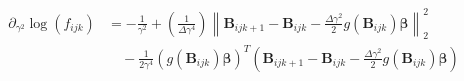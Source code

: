 \begin{align*}
\partial_{\gamma^2} \log(f_{ijk}) 
&= -\frac{1}{\gamma^2} 
+ \left( \frac{1}{\Delta \gamma^4} \right)
\left\lVert 
\textbf{B}_{ijk+1} - \textbf{B}_{ijk} 
- \frac{\Delta \gamma^2}{2} g(\textbf{B}_{ijk}) \bm{\beta}
\right\rVert_2^2 \\
&\quad - \frac{1}{2\gamma^4} 
\left( g(\textbf{B}_{ijk}) \bm{\beta} \right)^T 
\left( \textbf{B}_{ijk+1} - \textbf{B}_{ijk} 
- \frac{\Delta \gamma^2}{2} g(\textbf{B}_{ijk}) \bm{\beta} \right)
\end{align*}



\begin{comment}
    
We are given a grid of values $\{f_{ij}\}_{i,j}$ that represent the value of a covariate at points $(x_i, y_j)$. If we take a point $(x,y)$ in the study area, and say that $y_1$ is the value directly below $y$, $y_2$ is the value directly above $y$, $x_1$ is the value directly below $x$ and $x_2$ is the value directly above $x$ on the grid, then we can use linear interpolation to estimate the covariate at $(x,y)$ as 

$$
\hat{f}(x,y) = \frac{y_2-y}{y_2-y_1}(\frac{x_2-x}{x_2-x_1}f_{11} + \frac{x-x_1}{x_2-x_1}f_{21}) + \frac{y - y_1}{y_2-y_1}(\frac{x_2-x}{x_2-x_1}f_{12} + \frac{x-x_1}{x_2-x_1}f_{22})
$$

where $f_{11}$ is the value of the covariate $f$ at $(x_1, y_1)$, $f_{12}$ the value of $f$ at $(x_1, y_2)$, $f_{21}$ the value of $f$ at $(x_2, y_1)$, and $f_{22}$ the value of $f$ at $(x_2, y_2)$.

If we discretize the study area using $A_{ij} = \{(x,y) \in \mathbb{R}|x_i < x < x_{i+1}, y_j < y < y_{j+1}  \}$, then we can find the intensity of each area as


$$
\lambda_{ij} = \int_{x_i}^{x_{i+1}} \int_{y_i}^{y_{i+1}} \hat{f}(x,y) dydx
$$
$$
=\int_{x_i}^{x_{i+1}} [\frac{y_2y-y^2/2}{y_2-y_1}(\frac{x_2-x}{x_2-x_1}f_{11} + \frac{x-x_1}{x_2-x_1}f_{21}) + \frac{y^2/2 - y_1y}{y_2-y_1}(\frac{x_2-x}{x_2-x_1}f_{12} + \frac{x-x_1}{x_2-x_1}f_{22})]_{y_1}^{y_2} 
$$
$$
= \int_{x_i}^{x_{i+1}} [\frac{y_2(y_2-y_1)-(y_2-y_1)^2/2}{y_2-y_1}(\frac{x_2-x}{x_2-x_1}f_{11} + \frac{x-x_1}{x_2-x_1}f_{21}) + \frac{(y_2-y_1)^2/2 - y_1(y_2-y_1)}{y_2-y_1}(\frac{x_2-x}{x_2-x_1}f_{12} + \frac{x-x_1}{x_2-x_1}f_{22})]_{y_1}^{y_2} 
$$
$$
= \int_{x_i}^{x_{i+1}}\frac{1}{2}(y_2+y_1)(\frac{x_2-x}{x_2-x_1}f_{11} + \frac{x-x_1}{x_2-x_1}f_{21}) + \frac{1}{2}(y_2-3y_1)(\frac{x_2-x}{x_2-x_1}f_{12} + \frac{x-x_1}{x_2-x_1}f_{22}) 
$$
$$
=  \frac{1}{2}[(y_2+y_1)(\frac{x_2x-x^2/2}{x_2-x_1}f_{11} + \frac{x^2/2-x_1x}{x_2-x_1}f_{21}) + (y_2-3y_1)(\frac{x_2x-x^2/2}{x_2-x_1}f_{12} + \frac{x^2/2-x_1x}{x_2-x_1}f_{22})]_{x_1}^{x_2}
$$
$$
= \frac{1}{2} ((y_2+y_1)(\frac{x_2(x_2-x_1)-(x_2-x_1)^2/2}{x_2-x_1}f_{11} + \frac{(x_2-x_1)^2/2-x_1(x_2-x_1)}{x_2-x_1}f_{21}) + (y_2-3y_1)(\frac{x_2(x_2-x_1)-(x_2-x_1)^2/2}{x_2-x_1}f_{12} + \frac{(x_2-x_1)^2/2-x_1(x_2-x_1)}{x_2-x_1}f_{22})) 
$$
$$
= \frac{1}{4} ((y_2+y_1)((x_2+x_1)f_{11} + (x_2-3x_1)f_{21}) + (y_2-3y_1)((x_2+x_1)f_{12} + (x_2-3x_1)f_{22})) 
$$

where $\lambda_{ij}$ is the intensity for area $i,j$.
\end{comment}
